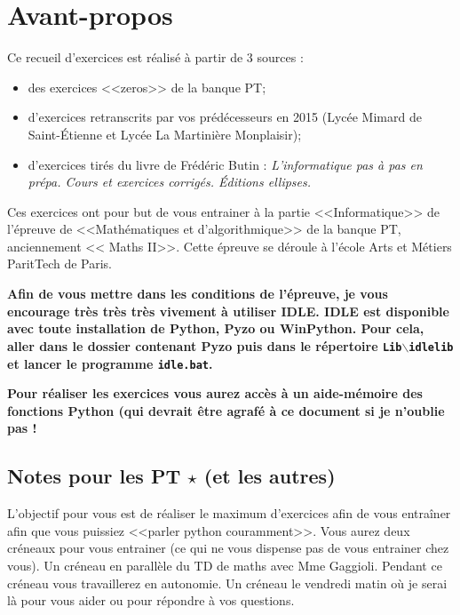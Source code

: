 \documentclass[10pt,fleqn]{article} %
\begin{document}


\newpage
\def\columnseprulecolor{\color{ocre}}
\setlength{\columnseprule}{0.4pt} 

\section{Avant-propos}
Ce recueil d'exercices est réalisé à partir de 3 sources : 
\begin{itemize}
\item des exercices <<zeros>> de la banque PT; 
\item d'exercices retranscrits par vos prédécesseurs en 2015 (Lycée Mimard de Saint-Étienne et Lycée La Martinière Monplaisir);
\item d'exercices tirés du livre de Frédéric Butin : \textit{L'informatique pas à pas en prépa. Cours et exercices corrigés. Éditions ellipses.}
\end{itemize}

Ces exercices ont pour but de vous entrainer à la partie <<Informatique>> de l'épreuve de <<Mathématiques et d'algorithmique>> de la banque PT, anciennement << Maths II>>. Cette épreuve se déroule à l'école Arts et Métiers ParitTech de Paris.


\begin{warn}
\large{\textbf{
Afin de vous mettre dans les conditions de l'épreuve, je vous encourage très très très vivement à utiliser IDLE. IDLE est disponible avec toute installation de Python, Pyzo ou WinPython. 
Pour cela, aller dans le dossier contenant Pyzo puis dans le répertoire \texttt{Lib$\backslash$idlelib} et lancer le programme \texttt{idle.bat}.}

\textbf{Pour réaliser les exercices vous aurez accès à un aide-mémoire des fonctions Python  (qui devrait être agrafé à ce document si je n'oublie pas !}}
\end{warn}

\subsection*{Notes pour les PT $\star$ (et les autres)}

L'objectif pour vous est de réaliser le maximum d'exercices afin de vous entraîner afin que vous puissiez <<parler python couramment>>.  Vous aurez deux créneaux pour vous entrainer (ce qui ne vous dispense pas de vous entrainer chez vous). Un créneau en parallèle du TD de maths avec Mme Gaggioli. Pendant ce créneau vous travaillerez en autonomie. Un créneau le vendredi matin où je serai là pour vous aider ou pour répondre à vos questions. 
\end{document}
